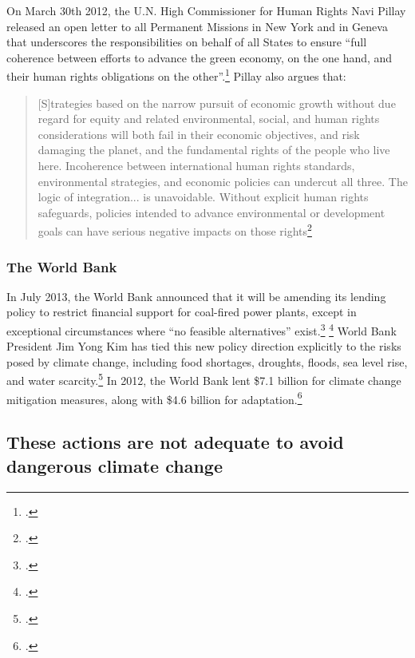 On March 30th 2012, the U.N. High Commissioner for Human Rights Navi Pillay released an open letter to all Permanent Missions in New York and in Geneva that underscores the responsibilities on behalf of all States to ensure ``full coherence between efforts to advance the green economy, on the one hand, and their human rights obligations on the other''.\footcite[][p. 2]{Pillay2012}
Pillay also argues that:
\begin{quote}
[S]trategies based on the narrow pursuit of economic growth without due regard for equity and related environmental, social, and human rights considerations will both fail in their economic objectives, and risk damaging the planet, and the fundamental rights of the people who live here. Incoherence between international human rights standards, environmental strategies, and economic policies can undercut all three. The logic of integration... is unavoidable. Without explicit human rights safeguards, policies intended to advance environmental or development goals can have serious negative impacts on those rights\footcite[][p. 2]{Pillay2012}
\end{quote}



	\subsubsection{The World Bank}



In July 2013, the World Bank announced that it will be amending its lending policy to restrict financial support for coal-fired power plants, except in exceptional circumstances where ``no feasible alternatives'' exist.\footcite[][]{WorldBankCoal2013} \footcite[See also: ][]{ReutersonWBCoal}
World Bank President Jim Yong Kim has tied this new policy direction explicitly to the risks posed by climate change, including food shortages, droughts, floods, sea level rise, and water scarcity.\footcite[][]{WBPresonCC}
In 2012, the World Bank lent \$7.1 billion for climate change mitigation measures, along with \$4.6 billion for adaptation.\footcite[][]{WorldBankCCPP}




		\subsection{These actions are not adequate to avoid dangerous climate change}
		
		




